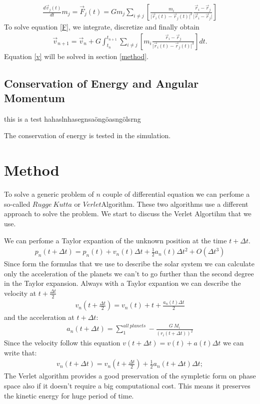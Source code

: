 \documentclass[a4paper]{article}
\begin{document}
\begin{align} \label{F}
\frac{d \vec{v}_j(t)}{dt} m_j = \vec{F}_j(t) = G m_j \sum \limits_{i \neq j} \left[ \frac{m_i}{\lvert \vec{r}_i(t)-\vec{r}_j(t) \lvert ^2} \frac{\vec{r}_i-\vec{r}_j}{\lvert \vec{r}_i-\vec{r}_j \lvert} \right]
\end{align}
To solve equation \ref{F}, we integrate, discretize and finally obtain
\begin{align}\label{v}
\vec{v}_{n+1} = \vec{v}_n +  G \int_{t_n}^{t_{n+1}} \sum \limits_{i \neq j} \left[ m_i \frac{\vec{r}_i-\vec{r}_j}{\lvert \vec{r}_i(t)-\vec{r}_j(t) \lvert ^3} \right] dt.
\end{align}
Equation \ref{v} will be solved in section \ref{method}.






\subsection{Conservation of Energy and Angular Momentum}\label{energyc}
this is a test hahaslnhasegnsaöngöasngölsrng

The conservation of energy is tested in the simulation.


 
 
 
\section{Method}
To solve a generic problem of $n$ couple of differential equation we can perfome a so-called $Rugge \ Kutta$ or $Verlet $Algorithm. These two algorithms use a different approach to solve the problem. We start to discuss the Verlet Algortihm that we use. 

We can perfome a Taylor expantion of the unknown position at the time $t + \Delta t$.  
\begin{align}
p_n(t + \Delta t) = p_n(t) + v_n(t)\Delta t + \frac{1}{2}a_n(t)\Delta t^2  + O(\Delta t^3) 
\end{align}
Since form the formulas that we use to describe the solar system we can calculate only the acceleration of the planets we can't  to go further than the second degree in the Taylor expansion.
Always with a Taylor expantion we can describe the velocity at $t + \frac{\Delta t}{2}$ 
\begin{align}
v_n(t + \frac{\Delta t}{2}) = v_n(t) + t + \frac{a_n(t)\Delta t}{2} 
\end{align}
and the acceleration at $t + \Delta t$:
\begin{align}
a_n(t + \Delta t) = \sum_{1}^{all \ planets} - \frac{G \ M_i}{(r_i(t + \Delta t))^2}
\end{align}
Since the velocity follow this equation $v(t + \Delta t) = v(t) + a(t)\Delta t$ we can write that:
\begin{align}
v_n(t + \Delta t) = v_n(t + \frac{\Delta t}{2}) + \frac{1}{2}a_n(t+ \Delta t)\Delta t;
\end{align}
The Verlet algorithm provides a good preservation of the sympletic form on phase space also if it doesn't require a big computational cost. This means it preserves the kinetic energy for huge period of time. 
\end{document}
